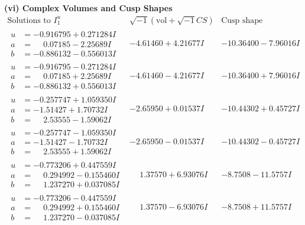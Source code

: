 \documentclass[1p]{elsarticle_modified}
\theoremstyle{definition}
\newcommand{\I}{\sqrt{-1}}
\begin{document}
\newpage\flushleft \textbf{(vi) Complex Volumes and Cusp Shapes}
$$\begin{array}{c|c|c}  
\text{Solutions to }I^u_{1}& \I (\text{vol} + \sqrt{-1}CS) & \text{Cusp shape}\\
 \hline 
\begin{aligned}
u &= -0.916795 + 0.271284 I \\
a &= \phantom{-}0.07185 - 2.25689 I \\
b &= -0.886132 - 0.556013 I\end{aligned}
 & -4.61460 + 4.21677 I & -10.36400 - 7.96016 I \\ \hline\begin{aligned}
u &= -0.916795 - 0.271284 I \\
a &= \phantom{-}0.07185 + 2.25689 I \\
b &= -0.886132 + 0.556013 I\end{aligned}
 & -4.61460 - 4.21677 I & -10.36400 + 7.96016 I \\ \hline\begin{aligned}
u &= -0.257747 + 1.059350 I \\
a &= -1.51427 + 1.70732 I \\
b &= \phantom{-}2.53555 - 1.59062 I\end{aligned}
 & -2.65950 + 0.01537 I & -10.44302 + 0.45727 I \\ \hline\begin{aligned}
u &= -0.257747 - 1.059350 I \\
a &= -1.51427 - 1.70732 I \\
b &= \phantom{-}2.53555 + 1.59062 I\end{aligned}
 & -2.65950 - 0.01537 I & -10.44302 - 0.45727 I \\ \hline\begin{aligned}
u &= -0.773206 + 0.447559 I \\
a &= \phantom{-}0.294992 - 0.155460 I \\
b &= \phantom{-}1.237270 + 0.037085 I\end{aligned}
 & \phantom{-}1.37570 + 6.93076 I & -8.7508 - 11.5757 I \\ \hline\begin{aligned}
u &= -0.773206 - 0.447559 I \\
a &= \phantom{-}0.294992 + 0.155460 I \\
b &= \phantom{-}1.237270 - 0.037085 I\end{aligned}
 & \phantom{-}1.37570 - 6.93076 I & -8.7508 + 11.5757 I \\ \hline\begin{aligned}

\end{aligned}
\end{array}$$
\end{document}
